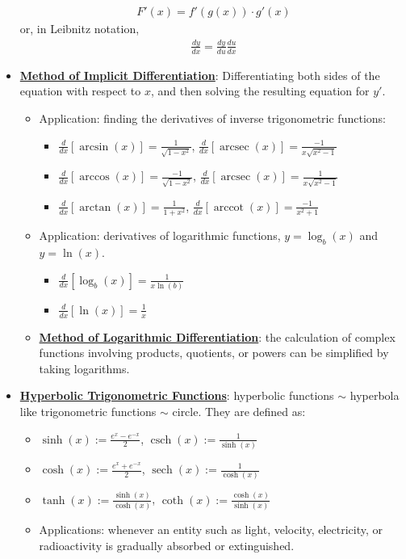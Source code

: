 \documentclass[reqno,11pt]{amsart}
\theoremstyle{definition}
\theoremstyle{remark}
\newcommand{\dfn}[1]{\underline{\textbf{#1}}}
\newcommand{\deriv}[1]{\frac{d}{dx} \left[ #1 \right]}
\DeclareMathOperator{\arcsec}{arcsec}
\DeclareMathOperator{\arccot}{arccot}
\DeclareMathOperator{\csch}{csch}
\DeclareMathOperator{\sech}{sech}
\begin{document}
\begin{itemize}[noitemsep]
\begin{align}
		F'(x) = f'(g(x)) \cdot g'(x)	
	\end{align}
	or, in Leibnitz notation, 
	\begin{align}
		\frac{dy}{dx} = \frac{dy}{du} \frac{du}{dx}	
	\end{align}
	\item \dfn{Method of Implicit Differentiation}: Differentiating both sides of the equation with respect to $x$, and then solving the resulting equation for $y'$. 
	\begin{itemize}[noitemsep]
		\item Application: finding the derivatives of inverse trigonometric functions: 
		\begin{itemize}[noitemsep]
			\item $\deriv{\arcsin(x)} = \frac{1}{\sqrt{1-x^2}}$, $\deriv{\arcsec(x)} = \frac{-1}{x \sqrt{x^2 - 1}}$
			\item $\deriv{\arccos(x)} = \frac{-1}{\sqrt{1-x^2}}$, $\deriv{\arcsec(x)} = \frac{1}{x \sqrt{x^2-1}}$ 
			\item $\deriv{\arctan(x)} = \frac{1}{1+x^2}$, $\deriv{\arccot(x)} = \frac{-1}{x^2 +1}$ 
		\end{itemize}
		\item Application: derivatives of logarithmic functions, $y = \log_b(x)$ and $y = \ln(x)$. 
		\begin{itemize}[noitemsep]
			\item $\deriv{ \log_b(x)} = \frac{1}{x \ln (b)}$
			\item $\deriv{ \ln (x) } = \frac{1}{x}$
		\end{itemize}
		\item \dfn{Method of Logarithmic Differentiation}: the calculation of complex functions involving products, quotients, or powers can be simplified by taking logarithms. 
	\end{itemize}
	\item \dfn{Hyperbolic Trigonometric Functions}: hyperbolic functions $\sim$ hyperbola like trigonometric functions $\sim$ circle. They are defined as: 
	\begin{itemize}[noitemsep]
		\item $\sinh(x) := \frac{e^x - e^{-x}}{2}$, $\csch(x) := \frac{1}{\sinh(x)}$
		\item $\cosh(x) := \frac{e^x + e^{-x}}{2}$, $\sech(x) := \frac{1}{\cosh(x)}$
		\item $\tanh(x) := \frac{\sinh(x)}{\cosh(x)}$, $\coth(x) := \frac{\cosh(x)}{\sinh(x)}$
		\item Applications: whenever an entity such as light, velocity, electricity, or radioactivity is gradually absorbed or extinguished. 

\end{itemize}
\end{itemize}
\end{document}
